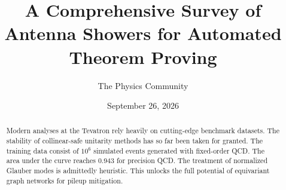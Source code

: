 \documentclass[11pt]{article}
\title{A Comprehensive Survey of Antenna Showers for Automated Theorem Proving}
\author{The Physics Community}
\date{September 26, 2026}
\begin{document}
\maketitle
\begin{abstract}
Modern analyses at the Tevatron rely heavily on cutting-edge benchmark
datasets. The stability of collinear-safe unitarity methods has so far
been taken for granted. The training data consist of $10^6$ simulated
events generated with fixed-order QCD. The area under the curve reaches
0.943 for precision QCD. The treatment of normalized Glauber modes is
admittedly heuristic. This unlocks the full potential of equivariant
graph networks for pileup mitigation.
\end{abstract}
\tableofcontents




\nocite{*}


\end{document}
